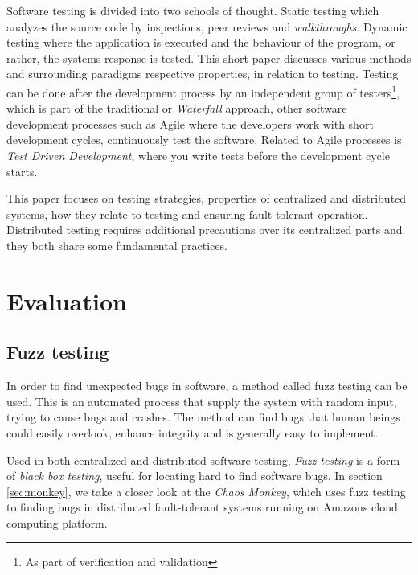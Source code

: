 \documentclass[10pt]{sensys-abstract}
\begin{document}
Software testing is divided into two schools of thought. Static testing which analyzes the source code by inspections, peer reviews and \emph{walkthroughs}. Dynamic testing where the application is executed and the behaviour of the program, or rather, the systems response is tested. This short paper discusses various methods and surrounding paradigms respective properties, in relation to testing. Testing can be done after the development process by an independent group of testers\footnote{As part of verification and validation}, which is part of the traditional or \emph{Waterfall} approach, other software development processes such as Agile where the developers work with short development cycles, continuously test the software. Related to Agile processes is \emph{Test Driven Development}, where you write tests before the development cycle starts.\cite{testing_techniques}

This paper focuses on testing strategies, properties of centralized and distributed systems, how they relate to testing and ensuring fault-tolerant operation. Distributed testing requires additional precautions over its centralized parts and they both share some fundamental practices.

\section{Evaluation}

\subsection{Fuzz testing}\noindent
In order to find unexpected bugs in software, a method called fuzz testing can be used. This is an automated process that supply the system with random input, trying to cause bugs and crashes. The method can find bugs that human beings could easily overlook, enhance integrity and is generally easy to implement.\cite{takanen2008fuzzing}

Used in both centralized and distributed software testing, \emph{Fuzz testing} is a form of \emph{black box testing}, useful for locating hard to find software bugs. In section \ref{sec:monkey}, we take a closer look at the \emph{Chaos Monkey}, which uses fuzz testing to finding bugs in distributed fault-tolerant systems running on Amazons cloud computing platform.
\end{document}

